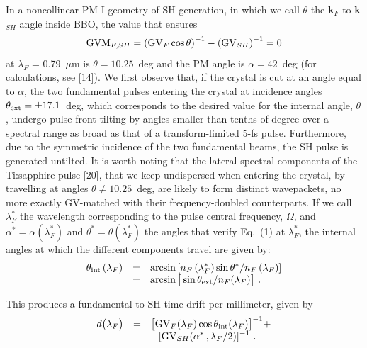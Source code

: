 \documentclass[times]{jtitauth}
\begin{document}
In a noncollinear PM I geometry of SH generation, in which we call
$\theta$ the {\bf k}$_F$-to-{\bf k}$_{SH}$ angle inside BBO, the
value that ensures
\begin{equation}
{\rm GVM}_{F,SH} = \left({\rm GV}_F \cos \theta \right )^{-1} -
\left ({\rm GV}_{SH}\right)^{-1} = 0
\end{equation}
at $\lambda_ F$ = 0.79~$\mu$m is $\theta = 10.25$~deg and the PM
angle is $\alpha = 42$~deg (for calculations, see [14]). We first
observe that, if the crystal is cut at an angle equal to $\alpha$,
the two fundamental pulses entering the crystal at incidence
angles $\theta_{{\rm ext}} = \pm 17.1$~deg, which corresponds to
the desired value for the internal angle, $\theta$, undergo
pulse-front tilting by angles smaller than tenths of degree over a
spectral range as broad as that of a transform-limited 5-fs pulse.
Furthermore, due to the symmetric incidence of the two fundamental
beams, the SH pulse is generated untilted. It is worth noting that
the lateral spectral components of the Ti:sapphire pulse [20],
that we keep undispersed when entering the crystal, by travelling
at angles $\theta \neq 10.25$~deg, are likely to form distinct
wavepackets, no more exactly GV-matched with their
frequency-doubled counterparts. If we call $\lambda_{F}^*$ the
wavelength corresponding to the pulse central frequency, $\Omega$,
and $\alpha^* = \alpha \left(\lambda_{F}^*\right)$ and $\theta^* =
\theta \left(\lambda_{F}^* \right)$ the angles that verify Eq.~(1)
at $\lambda_{F}^*$, the internal angles at which the different
components travel are given by:
\begin{equation}
\begin{array}{rcl}
\displaystyle{\theta_{\rm int} \left(\lambda_F\right)} & = &
\displaystyle{\arcsin \left[ n_F
\left(\lambda_{F}^* \right) \sin \theta^* / n_F \left(\lambda_F
\right)\right]}\\
& = & \displaystyle{\arcsin \big [\sin \theta_{\rm ext} / n_F
(\lambda_F)\big]~.}
\end{array}
\end{equation}

This produces a fundamental-to-SH time-drift per millimeter, given
by
\begin{equation}
\begin{array}{rcl}
\displaystyle{d\big(\lambda_F\big)} & = & \displaystyle{\big[{\rm GV}_F (\lambda_F) \cos
\theta_{\rm int} (\lambda_F)\big]^{-1} +} \\
& & \displaystyle{- [{\rm GV}_{SH} (\alpha^*
\, , \lambda_F /2)]^{-1}~.}
\end{array}
\end{equation}
\end{document}
